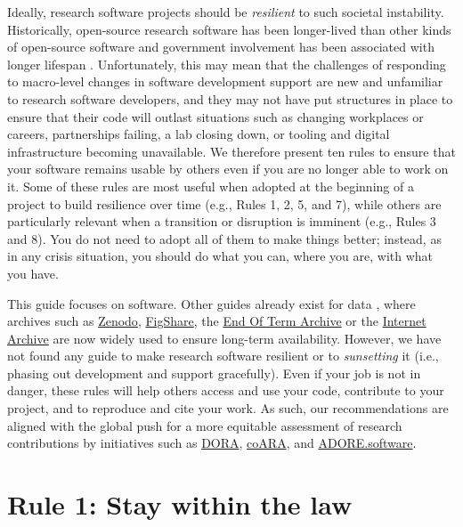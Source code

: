 \documentclass[10pt,letterpaper]{article}
\begin{document}
Ideally, research software projects should be \emph{resilient} to such societal instability.
Historically,
open-source research software has been longer-lived than other kinds of open-source software
and government involvement has been associated with longer lifespan \cite{Thakur2025}.
Unfortunately, this may mean that the challenges of responding to macro-level changes in software development support are new and unfamiliar to research software developers,
and they may not have put structures in place to ensure that their code will outlast situations such as changing workplaces or careers,
partnerships failing,
a lab closing down,
or tooling and digital infrastructure becoming unavailable.
We therefore present ten rules to ensure that your software remains usable by others
even if you are no longer able to work on it.
Some of these rules are most useful when adopted at the beginning of a project
to build resilience over time (e.g., Rules 1, 2, 5, and 7),
while others are particularly relevant when a transition or disruption is imminent
(e.g., Rules 3 and 8).
You do not need to adopt all of them to make things better;
instead,
as in any crisis situation,
you should do what you can,
where you are,
with what you have.

This guide focuses on software.
Other guides already exist for data \cite{Perkel2023},
where archives such as \href{https://zenodo.org/}{Zenodo},
\href{https://figshare.com/}{FigShare},
the \href{https://eotarchive.org/}{End Of Term Archive}
or the \href{http://archive.org/}{Internet Archive}
are now widely used to ensure long-term availability.
However,
we have not found any guide to make research software resilient
or to \emph{sunsetting} it (i.e., phasing out development and support gracefully).
Even if your job is not in danger,
these rules will help others access and use your code,
contribute to your project,
and to reproduce and cite your work.
As such,
our recommendations
are aligned with the global push for a more equitable assessment of research contributions
by initiatives such as \href{https://sfdora.org/}{DORA},
\href{https://coara.eu/}{coARA},
and \href{https://adore.software/}{ADORE.software}.

\section*{Rule 1: Stay within the law}
\end{document}
